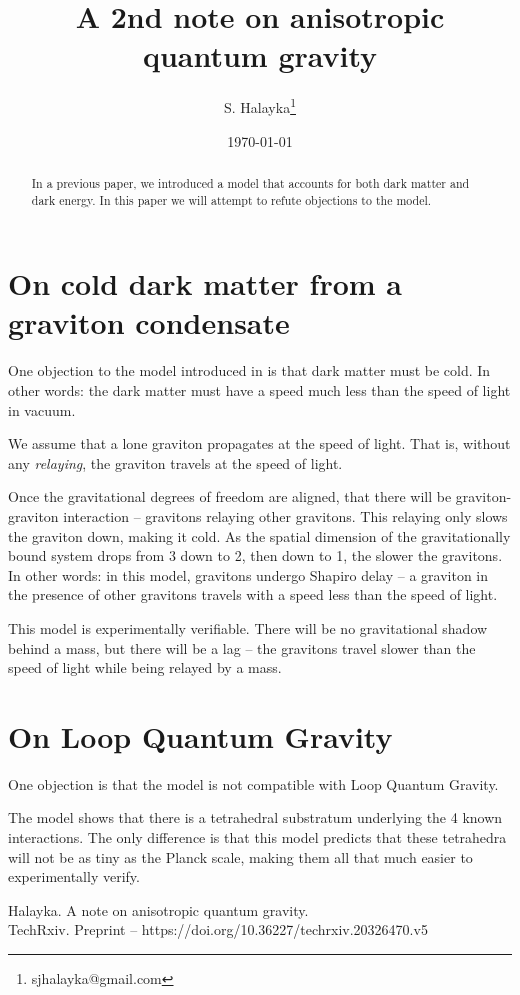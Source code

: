 \documentclass[12pt]{article}
\title{A 2nd note on anisotropic quantum gravity}
\author{S. Halayka\footnote{sjhalayka@gmail.com}}
\date{\today\;\currenttime}
\begin{document}
 
\maketitle

\begin{abstract}
In a previous paper, we introduced a model that accounts for both dark matter and dark energy. In this paper we will attempt to refute objections to the model.
\end{abstract}


\section{On cold dark matter from a graviton condensate}

One objection to the model introduced in \cite{halayka} is that dark matter must be cold. 
In other words: the dark matter must have a speed much less than the speed of light in vacuum.

We assume that a lone graviton propagates at the speed of light. 
That is, without any {\textit{relaying}}, the graviton travels at the speed of light.

Once the gravitational degrees of freedom are aligned, that there will be graviton-graviton interaction -- gravitons relaying other gravitons. 
This relaying only slows the graviton down, making it cold. 
As the spatial dimension of the gravitationally bound system drops from 3 down to 2, then down to 1, the slower the gravitons.
In other words: in this model, gravitons undergo Shapiro delay -- a graviton in the presence of other gravitons travels with a speed less than the speed of light.

This model is experimentally verifiable. 
There will be no gravitational shadow behind a mass, but there will be a lag -- the gravitons travel slower than the speed of light while being relayed by a mass.






\section{On Loop Quantum Gravity}

One objection is that the model is not compatible with Loop Quantum Gravity.

The model shows that there is a tetrahedral substratum underlying the 4 known interactions.
The only difference is that this model predicts that these tetrahedra will not be as tiny as the Planck scale, making them all that much easier to experimentally verify.







\begin{thebibliography}{9}

 Halayka. A note on anisotropic quantum gravity.\\TechRxiv. Preprint -- https://doi.org/10.36227/techrxiv.20326470.v5


\end{thebibliography}
\end{document}
